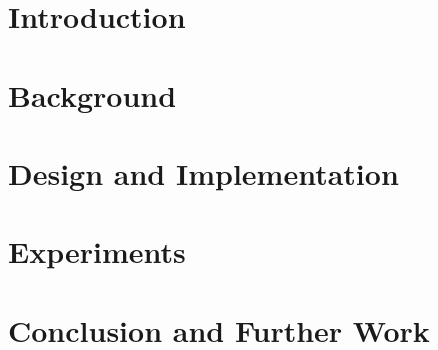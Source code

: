 \documentclass[10pt,conference]{IEEEtran}
\begin{document}
\section{Introduction}



\section{Background}




\section{Design and Implementation}




\section{Experiments}




\section{Conclusion and Further Work}
\end{document}
